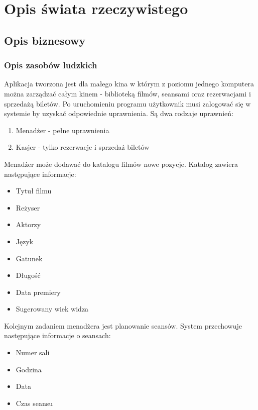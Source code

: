 \documentclass{article}
\begin{document}
	\section{Opis świata rzeczywistego}
	\subsection{Opis biznesowy}
	\subsubsection{Opis zasobów ludzkich}
	\par Aplikacja tworzona jest dla małego kina w którym z poziomu jednego komputera można zarządzać całym kinem - biblioteką filmów, seansami oraz rezerwacjami i sprzedażą biletów. Po uruchomieniu programu użytkownik musi zalogować się w systemie by uzyskać odpowiednie uprawnienia. Są dwa rodzaje uprawnień:
	\begin{enumerate}
		\item Menadżer - pełne uprawnienia
		\item Kasjer - tylko rezerwacje i sprzedaż biletów
	\end{enumerate}
	
	\par Menadżer może dodawać do katalogu filmów nowe pozycje. Katalog zawiera następujące informacje:
	\begin{multicols}{2}
		\begin{itemize}
			\item Tytuł filmu
			\item Reżyser
			\item Aktorzy
			\item Język
			\item Gatunek
			\item Długość
			\item Data premiery
			\item Sugerowany wiek widza
		\end{itemize}
	\end{multicols}
	
	\par Kolejnym zadaniem menadżera jest planowanie seansów. System przechowuje następujące informacje o seansach:
	\begin{multicols}{2}
		\begin{itemize}
			\item Numer sali
			\item Godzina
			\item Data
			\item Czas seansu
		\end{itemize}
	\end{multicols}
	
\end{document}
